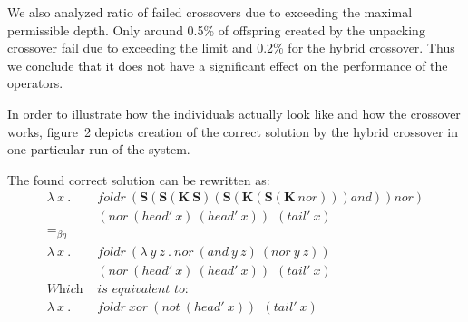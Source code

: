 \documentclass{sig-alternate}
\newcommand{\Scomb }{\mathbf{S}}
\newcommand{\Kcomb }{\mathbf{K}}
\newcommand{\beeq}{=_{\beta\eta}}
\newcommand{\red}[1]{{\color{red} #1}}
\begin{document}
We also analyzed ratio of failed crossovers due to exceeding the maximal permissible depth. Only around 0.5\% of offspring created by the unpacking crossover fail due to exceeding the limit and 0.2\% for the hybrid crossover. Thus we conclude that it does not have a significant effect on the performance of the operators.


In order to illustrate how the individuals actually look like and how the crossover works, figure~2 depicts creation of the correct solution by the hybrid crossover in one particular run of the system. 

The found correct solution can be rewritten as: 
\begin{align*}
\lambda~x~.~&foldr~(\Scomb(\Scomb (\Kcomb~\Scomb) (\Scomb (\Kcomb (\Scomb  (\Kcomb~nor) ) ) and) ) nor )  \\
 & (nor~(head'~x)~(head'~x))~ ~(tail'~x)\\
 \beeq & \\
\lambda~x~.~&foldr~(\lambda~y~z~.~nor~(and~y~z)~(nor~y~z)  )\\
 & (nor~(head'~x)~(head'~x))~ ~(tail'~x)\\
 \textit{Which~} & \textit{is equivalent to:}\\
\lambda~x~.~&foldr~xor~(not~(head'~x))~ ~(tail'~x) 
\end{align*}
\end{document}
